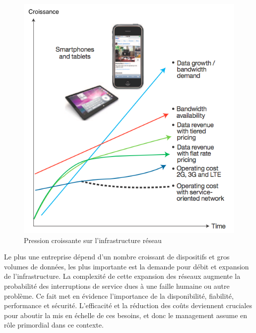 \begin{figure}[!h] %
\includegraphics[width=15cm]{images/IncreasingPressureOnNetworkInfra.png} %
\caption{ Pression croissante sur l'infrastructure réseau \cite{IBMManagingGrowingPainsNeed}} %
\label{image_soleil} %
\end{figure} %



\clearpage

Le plus une entreprise dépend d'un nombre croissant de dispositifs et gros volumes de données, les plus importante est la demande pour débit et expansion de l'infrastructure. La complexité de cette expansion des réseaux augmente la probabilité des interruptions de service dues à une faille humaine ou autre problème. Ce fait met en évidence l'importance de la disponibilité, fiabilité, performance et sécurité. L'efficacité et la réduction des coûts deviennent cruciales pour aboutir la mis en échelle de ces besoins, et donc le management assume en rôle primordial dans ce contexte. \cite{IBMManagingGrowingPainsNeed}
 

